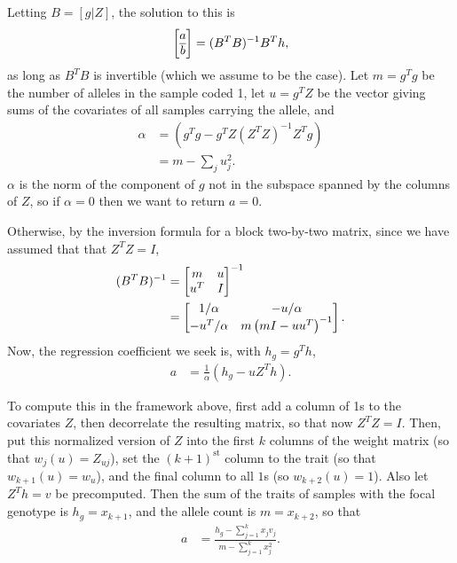\documentclass[9pt,twoside,lineno]{gsajnl}
\begin{document}
Letting $B = [g | Z]$, the solution to this is
\begin{align*}
    \left[\begin{array}{@{}c@{}}a\\\hline b\end{array}\right]
        = (B^T B)^{-1} B^T h ,
\end{align*}
as long as $B^T B$ is invertible (which we assume to be the case).
Let $m = g^T g$ be the number of alleles in the sample coded 1,
let $u = g^T Z$ be the vector giving sums of the covariates of all samples carrying the allele,
and
\begin{align*}
    \alpha
    &=
        (g^T g - g^T Z (Z^T Z)^{-1} Z^T g) \\
    &=
        m - \sum_j u_j^2 .
\end{align*}
$\alpha$ is the norm of the component of $g$ not in the subspace spanned by the columns of $Z$,
so if $\alpha = 0$ then we want to return $a=0$.

Otherwise, by the inversion formula for a block two-by-two matrix,
since we have assumed that that $Z^T Z = I$,
\begin{align*}
    (B^T B)^{-1}
    &=
    \left[
        \begin{array}{@{}cc@{}}
            m & u \\
            u^T & I
        \end{array}
    \right]^{-1} \\
    &=
    \left[
        \begin{array}{@{}cc@{}}
            1/\alpha
            &
            - u / \alpha
            \\
            - u^T / \alpha
            &
            m \left(m I - u u^T \right)^{-1}
        \end{array}
    \right] .
\end{align*}
Now, the regression coefficient we seek is,
with $h_g = g^T h$,
\begin{align*}
    a
    &=
    \frac{1}{\alpha} \left(
        h_g - u Z^T h
    \right) .
\end{align*}

To compute this in the framework above,
first add a column of 1s to the covariates $Z$,
then decorrelate the resulting matrix, so that now $Z^T Z = I$.
Then, put this normalized version of $Z$
into the first $k$ columns of the weight matrix (so that $w_j(u) = Z_{uj}$),
set the $(k+1)^\text{st}$ column to the trait (so that $w_{k+1}(u) = w_u$),
and the final column to all $1$s (so $w_{k+2}(u) = 1$).
Also let $Z^T h = v$ be precomputed.
Then the sum of the traits of samples with the focal genotype is $h_g = x_{k+1}$,
and the allele count is $m = x_{k+2}$,
so that
\begin{align*}
    a
    &=
    \frac{
        h_g - \sum_{j=1}^k x_j v_j
    }{
        m - \sum_{j=1}^k x_j^2 } .
\end{align*}
\end{document}
